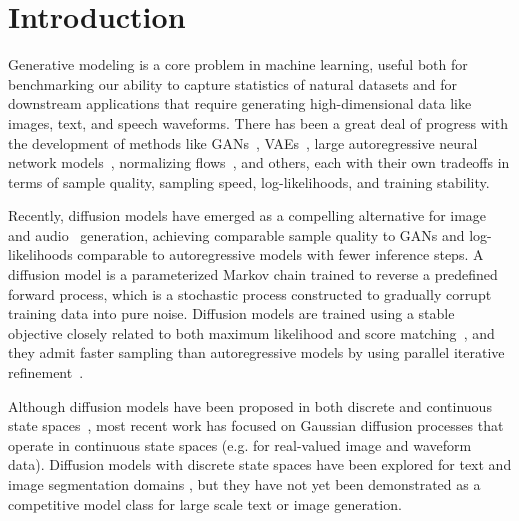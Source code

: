 \section{Introduction}

Generative modeling is a core problem in machine learning, useful both for benchmarking our ability to capture statistics of natural datasets and for downstream applications that require generating high-dimensional data like images, text, and speech waveforms.
There has been a great deal of progress with the development of methods like GANs~\citep{goodfellow2014generative,brock2018large}, VAEs~\citep{kingma2013auto,rezende2014stochastic}, large autoregressive neural network models~\citep{oord2016pixel,oord2016wavenet,vaswani2017attention}, normalizing flows~\citep{rezende2015variational, dinh2016density, kingma2018glow,papamakarios2019normalizing}, and others, each with their own tradeoffs in terms of sample quality, sampling speed, log-likelihoods, and training stability.

Recently, diffusion models \citep{sohl2015deep} have emerged as a compelling alternative for  image~\citep{ho2020denoising,song2020improved} and audio~\citep{wavegrad,kong2020diffwave} generation, achieving comparable sample quality to GANs and log-likelihoods comparable to autoregressive models with fewer inference steps. 
A diffusion model is a parameterized Markov chain trained to reverse a predefined forward process, which is a stochastic process constructed to gradually corrupt training data into pure noise.
Diffusion models are trained using a stable objective closely related to both maximum likelihood and score matching~\citep{hyvarinen2004independent,vincent2011connection}, and they admit faster sampling than autoregressive models by using parallel iterative refinement~\citep{nichol2021improved,song_2019,song2020_sde,song2021implicit}.

Although diffusion models have been proposed in both discrete and continuous state spaces~\citep{sohl2015deep}, most recent work has focused on Gaussian diffusion processes that operate in continuous state spaces (e.g. for real-valued image and waveform data). Diffusion models with discrete state spaces have been explored for text and image segmentation domains \citep{hoogeboom2021argmax}, but they have not yet been demonstrated as a competitive model class for large scale text or image generation.


